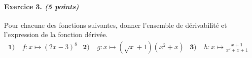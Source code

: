 \documentclass[11pt]{article}
\begin{document}
\paragraph{Exercice 3. \emph{(5 points)}} Pour chacune des fonctions suivantes, donner l'ensemble
de dérivabilité et l'expression de la fonction dérivée.
\begin{align*}
  \textbf{1)}\;& f:x\mapsto (2x-3)^{8} &
  \textbf{2)}\;& g:x\mapsto (\sqrt x+1)(x^2+x) &
  \textbf{3)}\;& h:x\mapsto \frac{x+1}{x^2+x+1}
\end{align*}
\end{document}
